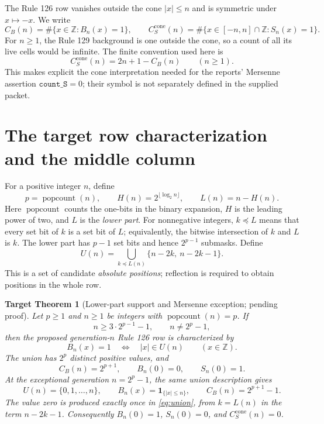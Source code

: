 \documentclass[11pt]{article}
\newtheorem{targettheorem}{Target Theorem}
\newcommand{\pc}{\operatorname{popcount}}
\newcommand{\sub}{\preceq}
\newcommand{\ind}{\mathbf{1}}
\newcommand{\Z}{\mathbb{Z}}
\begin{document}
The Rule 126 row vanishes outside the cone $|x|\leq n$ and is symmetric
under $x\mapsto-x$. We write
\[
 C_B(n)=\#\{x\in\Z:B_n(x)=1\},\qquad
 C_S^{\mathrm{cone}}(n)=\#\{x\in[-n,n]\cap\Z:S_n(x)=1\}.
\]
For $n\geq1$, the Rule 129 background is one outside the cone, so a count
of all its live cells would be infinite. The finite convention used here is
\begin{equation}
 C_S^{\mathrm{cone}}(n)=2n+1-C_B(n)\qquad(n\geq1).
 \label{eq:conecount}
\end{equation}
This makes explicit the cone interpretation needed for the reports'
Mersenne assertion $\texttt{count\_S}=0$; their symbol is not separately
defined in the supplied packet.

\section{The target row characterization and the middle column}
\label{sec:target}

For a positive integer $n$, define
\[
 p=\pc(n),\qquad H(n)=2^{\lfloor\log_2 n\rfloor},\qquad L(n)=n-H(n).
\]
Here $\pc$ counts the one-bits in the binary expansion, $H$ is the leading
power of two, and $L$ is the \emph{lower part}. For nonnegative integers,
$k\sub L$ means that every set bit of $k$ is a set bit of $L$; equivalently,
the bitwise intersection of $k$ and $L$ is $k$. The lower part has $p-1$
set bits and hence $2^{p-1}$ submasks. Define
\begin{equation}
 U(n)=\bigcup_{k\sub L(n)}\{n-2k,\ n-2k-1\}.
 \label{eq:union}
\end{equation}
This is a set of candidate \emph{absolute positions}; reflection is required
to obtain positions in the whole row.

\begin{targettheorem}[Lower-part support and Mersenne exception;
pending proof]\label{thm:target}
Let $p\geq1$ and $n\geq1$ be integers with $\pc(n)=p$. If
\begin{equation}
 n\geq3\cdot2^{p-1}-1,\qquad n\ne2^p-1,
 \label{eq:hyp}
\end{equation}
then the proposed generation-$n$ Rule 126 row is characterized by
\begin{equation}
 B_n(x)=1\quad\Longleftrightarrow\quad |x|\in U(n)
 \qquad(x\in\Z).
 \label{eq:support}
\end{equation}
The union has $2^p$ distinct positive values, and
\begin{equation}
 C_B(n)=2^{p+1},\qquad B_n(0)=0,\qquad S_n(0)=1.
 \label{eq:ordinarycount}
\end{equation}
At the exceptional generation $n=2^p-1$, the same union description gives
\begin{equation}
 U(n)=\{0,1,\ldots,n\},\qquad
 B_n(x)=\ind_{\{|x|\leq n\}},\qquad C_B(n)=2^{p+1}-1.
 \label{eq:mersenne}
\end{equation}
The value zero is produced exactly once in \eqref{eq:union}, from
$k=L(n)$ in the term $n-2k-1$. Consequently $B_n(0)=1$, $S_n(0)=0$,
and $C_S^{\mathrm{cone}}(n)=0$.
\end{targettheorem}
\end{document}
